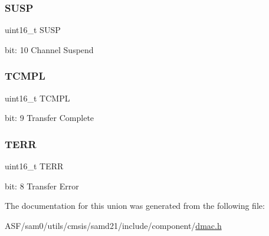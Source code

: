 \subsubsection{\texorpdfstring{SUSP}{SUSP}}
{\footnotesize\ttfamily uint16\+\_\+t S\+U\+SP}

bit\+: 10 Channel Suspend \mbox{\label{union_d_m_a_c___i_n_t_p_e_n_d___type_ae0ac120824598c21c231eaee97cf818e}} 
\subsubsection{\texorpdfstring{TCMPL}{TCMPL}}
{\footnotesize\ttfamily uint16\+\_\+t T\+C\+M\+PL}

bit\+: 9 Transfer Complete \mbox{\label{union_d_m_a_c___i_n_t_p_e_n_d___type_afff2a374bc3b976a3c98720b69a5a416}} 
\subsubsection{\texorpdfstring{TERR}{TERR}}
{\footnotesize\ttfamily uint16\+\_\+t T\+E\+RR}

bit\+: 8 Transfer Error 

The documentation for this union was generated from the following file\+:\begin{DoxyCompactItemize}
\item 
A\+S\+F/sam0/utils/cmsis/samd21/include/component/\mbox{\hyperlink{component_2dmac_8h}{dmac.\+h}}\end{DoxyCompactItemize}

